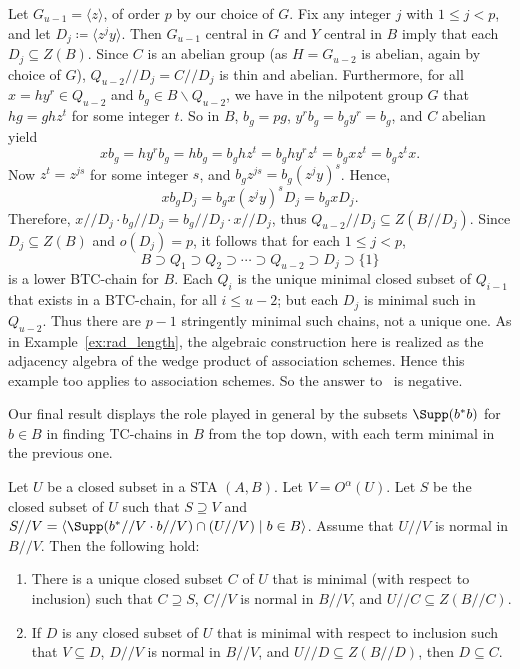 \begin{exam}
Let $G_{u-1} = \langle z \rangle$, of order $p$ by our choice of $G$.
Fix any integer $j$ with $1 \leq j < p$, and let $D_j \coloneqq \langle z^jy
\rangle$. Then $G_{u-1}$ central in $G$ and $Y$ central in $B$ imply
that each $D_j \subseteq Z(B)$. Since $C$ is an abelian group (as $H = G_{u-2}$ is abelian,
again by choice of $G$), $Q_{u-2}//D_j = C//D_j$ is thin and abelian.
Furthermore, for all $x = hy^r \in Q_{u-2}$ and $b_g \in B\backslash
Q_{u-2}$, we have in the nilpotent group $G$ that $hg = ghz^t$ for some
integer $t$. So in $B$, $b_g = pg$, $y^rb_g = b_gy^r = b_g$, and $C$
abelian yield
\[
xb_g = hy^rb_g = hb_g = b_ghz^t = b_ghy^rz^t = b_gxz^t = b_gz^tx.
\]
Now $z^t = z^{js}$ for some integer $s$, and $b_gz^{js} = b_g(z^jy)^s$.
Hence,
\[
xb_gD_j = b_gx(z^jy)^sD_j = b_gxD_j.
\]
Therefore, $x//D_j\cdot b_g//D_j = b_g//D_j\cdot x//D_j$, thus
$Q_{u-2}//D_j \subseteq Z(B//D_j)$. Since $D_j \subseteq Z(B)$ and
$o(D_j) = p$, it follows that for each $1 \leq j < p$, 
\[
B \supset Q_1 \supset Q_2 \supset \cdots \supset Q_{u-2} \supset D_j
\supset \{1\}
\]
is a lower BTC-chain for $B$. Each $Q_i$ is the unique minimal closed
subset of $Q_{i-1}$ that exists in a BTC-chain, for all $i \leq u-2$;
but each $D_j$ is minimal such in $Q_{u-2}$. Thus there are $p-1$
stringently minimal such chains, not a unique one. 
As in Example~\ref{ex:rad_length}, the
algebraic construction here is realized as the adjacency algebra of the wedge product of
association schemes. Hence this example too applies to association
schemes. 
 So the answer to~\cite [Question~2.11]{H} is negative.
\end{exam}


Our final result displays the role played in general by the subsets
$\Supp(b^*b)$ for $b \in B$ in finding TC-chains in $B$ from the
top down, with each term minimal in the previous one.

\begin{thm}
\label{thm:minimal}
Let $U$ be a closed subset in a STA $(A, B)$. Let $V =
O^{\alpha}(U)$. Let $S$ be the closed subset of $U$ such that $S
\supseteq V$ and $S//V = \langle \Supp(b^*//V\cdot b//V)\cap
(U//V)
 \mid b \in B\rangle $. Assume that $U//V$ is normal in $B//V$. Then the following hold:
\begin{enumerate}[label = \textup{(}\roman*\textup{)}] 
\item There is a unique closed subset $C$ of $U$ that
is minimal \textup{(}with respect to inclusion\textup{)} such that $C \supseteq S$, $C//V$
is normal in $B//V$,
 and $U//C \subseteq Z(B//C)$.
\item If $D$ is any closed subset of $U$ that is minimal with respect to
inclusion such that $V \subseteq D$, $D//V$
is normal in $B//V$, and $U//D \subseteq Z(B//D)$, then 
$D \subseteq C$.
\end{enumerate}
\end{thm}

